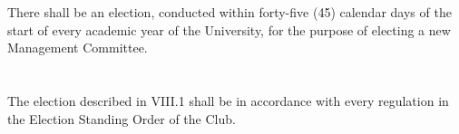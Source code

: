 
\section{}
There shall be an election, conducted within forty-five (45) calendar days of the start of every academic year of the University, for the purpose of electing a new Management Committee.

\section{}
The election described in VIII.1 shall be in accordance with every regulation in the Election Standing Order of the Club.